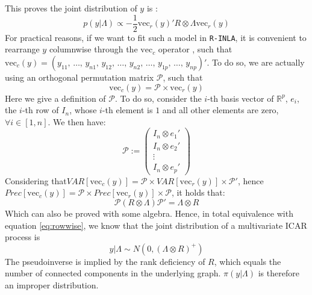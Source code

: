 \documentclass{article}
\begin{document}
This proves the joint distribution of $y$ is \citep[][this latter case regarding the PCAR]{Mardia, Banerjee, Gelfand}:
\begin{equation}
p(y  | \Lambda) \propto -\frac{1}{2} \mathrm{vec}_r(y) ' R \otimes \Lambda \mathrm{vec}_r(y)
\label{eq:rowwise}
\end{equation}
For practical reasons, if we want to fit such a model in \texttt{R-INLA}, it is convenient to rearrange $y$ columnwise through the $\mathrm{vec}_c$ operator \cite{INLAMSM}, such that $\mathrm{vec}_c(y) = (y_{11},\, \ldots, \,y_{n1},\, y_{12},\, \ldots,\, y_{n2},\, \ldots ,\, y_{1p}, \,\ldots, \,y_{np} )'$. To do so, we are actually using an orthogonal permutation matrix $\mathcal{P}$, such that 
$$\mathrm{vec}_c(y) = \mathcal{P} \times \mathrm{vec}_r(y)$$
Here we give a definition of $\mathcal{P}$. To do so, consider the $i$-th basis vector of $\mathbb{R}^p$, $e_i$, the $i$-th row of $I_n$, whose $i$-th element is $1$ and all other elements are zero, $\forall i \in [1,n]$. We then have:
$$
\mathcal{P}  := \begin{pmatrix} 
I_n \otimes e_1' \\ I_n \otimes e_2' \\ \vdots \\ I_n \otimes e_p'
\end{pmatrix}
$$
Considering that$
{VAR}[\mathrm{vec}_c(y)] = \mathcal{P} \times {VAR}[\mathrm{vec}_r(y)] \times \mathcal{P}'$, hence ${Prec}[\mathrm{vec}_c(y)] = \mathcal{P} \times {Prec}[\mathrm{vec}_r(y)] \times \mathcal{P}$, it holds that:
$$
\mathcal{P} \left( R \otimes \Lambda \right) \mathcal{P}'= \Lambda \otimes R
$$
Which can also be proved with some algebra. Hence, in total equivalence with equation \ref{eq:rowwise}, we know that the joint distribution of a multivariate ICAR process is
\begin{equation}
y|\Lambda \sim N \left( 0, (\Lambda \otimes R)^{+}\right)
\end{equation}
The pseudoinverse is implied by the rank deficiency of $R$, which equals the number of connected components in the underlying graph. $\pi(y | \Lambda)$ is therefore an improper distribution.
\end{document}
